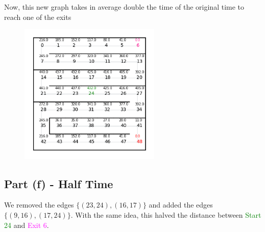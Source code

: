 Now, this new graph takes in average double the time of the original time to reach one of the exits

\begin{figure}[H]
    \centering
    \includegraphics[width=0.6\textwidth]{../pictures/432-2.png}
\end{figure}

\subsection*{Part (f) - Half Time}

We removed the edges $\{(23,24),(16,17)\}$ and added the edges $\{(9,16),(17,24)\}$. With the same idea, this halved the distance between \textcolor{Green}{Start 24} and \textcolor{magenta}{Exit 6}.

